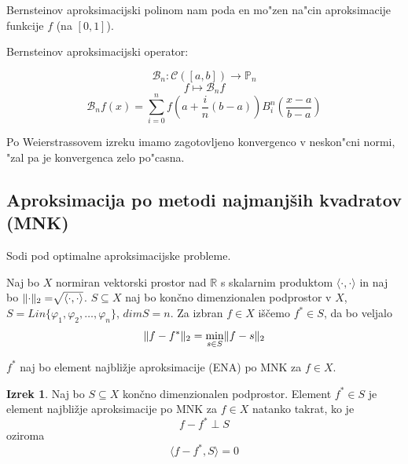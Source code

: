 \documentclass[a4paper,12pt]{article}
\DeclarePairedDelimiter\norm{\lVert}{\rVert}
\newcommand{\innerproduct}[2]{\langle #1, #2 \rangle}
\theoremstyle{definition}
\newtheorem{theorem}[counter]{Izrek}
\theoremstyle{remark}
\newcommand{\R}{\mathbb{R}}
\newcommand{\Pp}{\mathbb{P}}
\begin{document}
Bernsteinov aproksimacijski polinom nam poda en mo"zen na"cin aproksimacije funkcije $f$ (na $[0, 1]$).

Bernsteinov aproksimacijski operator:

\begin{equation*}
    \mathscr{B}_n : \mathscr{C} ([a, b]) \to \Pp_n
\end{equation*}
\begin{equation*}
    f \mapsto \mathscr{B}_n f
\end{equation*}
\begin{equation*}
    \mathscr{B}_n f(x) = \sum_{i = 0}^{n} f(a + \frac{i}{n}(b-a)) B_i^n (\frac{x-a}{b-a})
\end{equation*}

Po Weierstrassovem izreku imamo zagotovljeno konvergenco v neskon"cni normi, "zal pa je konvergenca zelo po"casna.



\subsection{Aproksimacija po metodi najmanjših kvadratov (MNK)}
Sodi pod optimalne aproksimacijske probleme.

Naj bo $X$ normiran vektorski prostor nad $\R$ s skalarnim produktom $\innerproduct{\cdot}{\cdot}$ in naj bo $\norm{\cdot}_2 = \sqrt[]{\innerproduct{\cdot}{\cdot}}$.
$S \subseteq X$ naj bo končno dimenzionalen podprostor v $X$, $S = Lin\{\varphi_1, \varphi_2, \dots, \varphi_n\}$, $dimS = n$. Za izbran $f \in X$ iščemo $f^* \in S$, da bo veljalo
\begin{equation*}
    \norm{f - f^*}_2 = \min_{s\in S} \norm{f - s}_2
\end{equation*}

$f^*$ naj bo element najbližje aproksimacije (ENA) po MNK za $f \in X$.

\begin{theorem}
    Naj bo $S \subseteq X$ končno dimenzionalen podprostor. Element $f^* \in S$ je element najbližje aproksimacije po MNK za $f \in X$ natanko takrat,
    ko je
    \begin{equation*}
        f - f^* \perp S
    \end{equation*}
    oziroma
    \begin{equation*}
        \innerproduct{f - f^*}{S} = 0
    \end{equation*}
\end{theorem}
\end{document}
